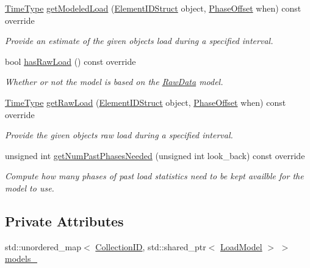\begin{DoxyCompactItemize}
\hyperlink{namespacevt_a876a9d0cd5a952859c72de8a46881442}{Time\+Type} \hyperlink{structvt_1_1vrt_1_1collection_1_1balance_1_1_per_collection_a465b8f14dead0affdaeb0cf24373565f}{get\+Modeled\+Load} (\hyperlink{namespacevt_1_1vrt_1_1collection_1_1balance_a9f5b53fafb270212279a4757d2c4cd28}{Element\+I\+D\+Struct} object, \hyperlink{structvt_1_1vrt_1_1collection_1_1balance_1_1_phase_offset}{Phase\+Offset} when) const override
\begin{DoxyCompactList}\small\item\em Provide an estimate of the given object\textquotesingle{}s load during a specified interval. \end{DoxyCompactList}\item 
bool \hyperlink{structvt_1_1vrt_1_1collection_1_1balance_1_1_per_collection_a82a94bbf8764a3c6bd346e4a686e1efb}{has\+Raw\+Load} () const override
\begin{DoxyCompactList}\small\item\em Whether or not the model is based on the \hyperlink{structvt_1_1vrt_1_1collection_1_1balance_1_1_raw_data}{Raw\+Data} model. \end{DoxyCompactList}\item 
\hyperlink{namespacevt_a876a9d0cd5a952859c72de8a46881442}{Time\+Type} \hyperlink{structvt_1_1vrt_1_1collection_1_1balance_1_1_per_collection_af5e29141a1527b165767596336f0d7a6}{get\+Raw\+Load} (\hyperlink{namespacevt_1_1vrt_1_1collection_1_1balance_a9f5b53fafb270212279a4757d2c4cd28}{Element\+I\+D\+Struct} object, \hyperlink{structvt_1_1vrt_1_1collection_1_1balance_1_1_phase_offset}{Phase\+Offset} when) const override
\begin{DoxyCompactList}\small\item\em Provide the given object\textquotesingle{}s raw load during a specified interval. \end{DoxyCompactList}\item 
unsigned int \hyperlink{structvt_1_1vrt_1_1collection_1_1balance_1_1_per_collection_ad71f5405a169c5fe2a25668df96c3a7c}{get\+Num\+Past\+Phases\+Needed} (unsigned int look\+\_\+back) const override
\begin{DoxyCompactList}\small\item\em Compute how many phases of past load statistics need to be kept availble for the model to use. \end{DoxyCompactList}\end{DoxyCompactItemize}
\subsection*{Private Attributes}
\begin{DoxyCompactItemize}
\item 
std\+::unordered\+\_\+map$<$ \hyperlink{structvt_1_1vrt_1_1collection_1_1balance_1_1_per_collection_ade08a6857f727a0a9d1ef63b25fc5b71}{Collection\+ID}, std\+::shared\+\_\+ptr$<$ \hyperlink{structvt_1_1vrt_1_1collection_1_1balance_1_1_load_model}{Load\+Model} $>$ $>$ \hyperlink{structvt_1_1vrt_1_1collection_1_1balance_1_1_per_collection_aec76660b4a44fe451a9546b4f4c50d3d}{models\+\_\+}
\end{DoxyCompactItemize}


